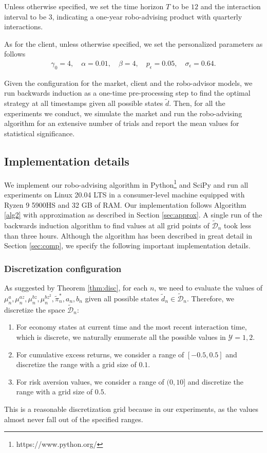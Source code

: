 Unless otherwise specified, we set the time horizon $T$ to be $12$ and the interaction interval to be $3$, indicating a one-year robo-advising product with quarterly interactions.

As for the client, unless otherwise specified, we set the personalized parameters as follows\begin{align*}
    \gamma_0=4,\quad \alpha=0.01,\quad \beta=4,\quad p_\epsilon=0.05,\quad \sigma_\epsilon=0.64.
\end{align*}

Given the configuration for the market, client and the robo-advisor models, we run backwards induction as a one-time pre-processing step to find the optimal strategy at all timestamps given all possible states $\tilde d$. Then, for all the experiments we conduct, we simulate the market and run the robo-advising algorithm for an extensive number of trials and report the mean values for statistical significance.

\subsection{Implementation details}\label{sec:impl}
We implement our robo-advising algorithm in Python\footnote{https://www.python.org/} and SciPy \cite{2020SciPy} and run all experiments on Linux 20.04 LTS in a consumer-level machine equipped with Ryzen 9 5900HS and 32 GB of RAM. Our implementation follows Algorithm \ref{alg2} with approximation as described in Section \ref{sec:approx}. A single run of the backwards induction algorithm to find values at all grid points of $\tilde{\mathcal{D}}_n$ took less than three hours. Although the algorithm has been described in great detail in Section \ref{sec:comp}, we specify the following important implementation details.

\subsubsection{Discretization configuration}
As suggested by Theorem \ref{thm:disc}, for each $n$, we need to evaluate the values of $\mu_n^a,\mu_n^{az},\mu_n^{bz},\mu_n^{bz^2},\tilde\pi_n^*,\allowbreak a_n,b_n$ given all possible states $\tilde d_n\in\tilde{\mathcal D}_n$. Therefore, we discretize the space $\tilde{\mathcal D}_n$:\begin{enumerate}
    \item For economy states at current time and the most recent interaction time, which is discrete, we naturally enumerate all the possible values in $\mathcal Y={1,2}$.
    \item For cumulative excess returns, we consider a range of $[-0.5,0.5]$ and discretize the range with a grid size of $0.1$.
    \item For risk aversion values, we consider a range of $(0,10]$ and discretize the range with a grid size of $0.5$.
\end{enumerate} This is a reasonable discretization grid because in our experiments, as the values almost never fall out of the specified ranges.

